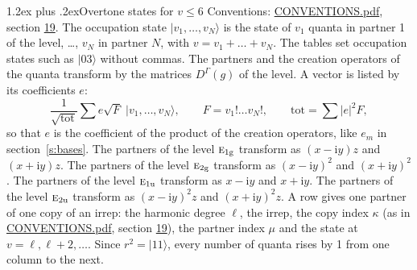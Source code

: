 \documentclass[10pt,a4paper]{article}
\makeatletter
\renewcommand\section{\@startsection{section}{1}{\z@}{-3ex plus -1ex minus -.2ex}%
  {1.2ex plus .2ex}{\normalfont\large\sffamily\bfseries\color{parttitle}}}
\numberwithin{equation}{section}
\newcommand{\irr}[1]{\text{\normalfont\scshape #1}}
\newcommand{\ptag}[1]{\mathrm{#1}}
\newcommand{\iunit}{\mathrm{i}}
\newcommand{\repD}[1]{D^{#1}}
\newcommand{\mult}{\kappa}
\newcommand{\intx}{\mu}
\newcommand{\occ}[1]{\lvert #1\rangle}
\makeatother
\begin{document}
\section{Overtone states for \texorpdfstring{$v \le 6$}{v \textleq\ 6}}\label{s:overtone_states}
Conventions: \href{../../CONVENTIONS.pdf}{CONVENTIONS.pdf}, section \href{../../CONVENTIONS.pdf\#conv.19}{19}.
\leavevmode\label{n:vector.occupation}\label{n:local.quanta.partner}\label{n:local.weight.occupation}The occupation state $\occ{v_1, \dots, v_N}$ is the state of $v_1$ quanta in partner 1 of the level, \dots, $v_N$ in partner $N$, with $v = v_1 + \dots + v_N$. The tables set occupation states such as $\occ{03}$ without commas. The partners and the creation operators of the quanta transform by the matrices $\repD{\Gamma}(g)$ of the level. A vector is listed by its coefficients $e$:
\begin{equation}\label{e:occupation}\frac{1}{\sqrt{\mathrm{tot}}}\sum e\sqrt{F}\;\occ{v_1, \dots, v_N},\qquad F = v_1!\dots v_N!,\qquad \mathrm{tot} = \sum |e|^2F,\end{equation}
so that $e$ is the coefficient of the product of the creation operators, like $e_m$ in section~\ref{s:bases}. The partners of the level $\irr{e}_{1\ptag{g}}$ transform as $(x - \iunit y) z$ and $(x + \iunit y) z$. The partners of the level $\irr{e}_{2\ptag{g}}$ transform as $(x - \iunit y)^{2}$ and $(x + \iunit y)^{2}$. The partners of the level $\irr{e}_{1\ptag{u}}$ transform as $x - \iunit y$ and $x + \iunit y$. The partners of the level $\irr{e}_{2\ptag{u}}$ transform as $(x - \iunit y)^{2} z$ and $(x + \iunit y)^{2} z$. A row gives one partner of one copy of an irrep: the harmonic degree $\ell$, the irrep, the copy index $\mult$ (as in \href{../../CONVENTIONS.pdf}{CONVENTIONS.pdf}, section \href{../../CONVENTIONS.pdf\#conv.19}{19}), the partner index $\intx$ and the state at $v = \ell, \ell + 2, \dots$. Since $r^2 = \occ{11}$, every number of quanta rises by 1 from one column to the next.
\end{document}

